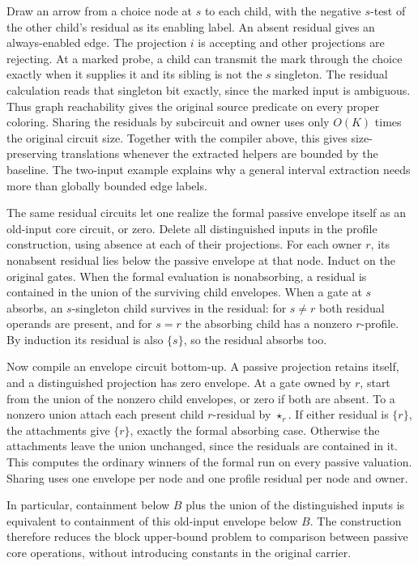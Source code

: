 Draw an arrow from a choice node at $s$ to each
child, with the negative $s$-test of the other
child's residual as its enabling label. An absent
residual gives an always-enabled edge. The
projection $i$ is accepting and other projections
are rejecting. At a marked probe, a child can
transmit the mark through the choice exactly
when it supplies it and its sibling is not the
$s$ singleton. The residual calculation reads
that singleton bit exactly, since the marked
input is ambiguous. Thus graph reachability
gives the original source predicate on every
proper coloring. Sharing the residuals by
subcircuit and owner uses only $O(K)$ times the
original circuit size. Together with the
compiler above, this gives size-preserving
translations whenever the extracted helpers
are bounded by the baseline. The two-input
example explains why a general interval
extraction needs more than globally bounded
edge labels.

The same residual circuits let one realize the
formal passive envelope itself as an old-input
core circuit, or zero. Delete all distinguished
inputs in the profile construction, using
absence at each of their projections. For each
owner $r$, its nonabsent residual lies below
the passive envelope at that node. Induct on
the original gates. When the formal evaluation
is nonabsorbing, a residual is contained in
the union of the surviving child envelopes.
When a gate at $s$ absorbs, an $s$-singleton
child survives in the residual: for $s\ne r$
both residual operands are present, and for
$s=r$ the absorbing child has a nonzero
$r$-profile. By induction its residual is
also $\{s\}$, so the residual absorbs too.

Now compile an envelope circuit bottom-up.
A passive projection retains itself, and a
distinguished projection has zero envelope.
At a gate owned by $r$, start from the union
of the nonzero child envelopes, or zero if
both are absent. To a nonzero union attach
each present child $r$-residual by $\star_r$.
If either residual is $\{r\}$, the
attachments give $\{r\}$, exactly the formal
absorbing case. Otherwise the attachments
leave the union unchanged, since the
residuals are contained in it. This computes
the ordinary winners of the formal run
on every passive valuation. Sharing uses
one envelope per node and one profile
residual per node and owner.

In particular, containment below $B$ plus
the union of the distinguished inputs is
equivalent to containment of this old-input
envelope below $B$. The construction therefore
reduces the block upper-bound problem to
comparison between passive core operations,
without introducing constants in the
original carrier.

